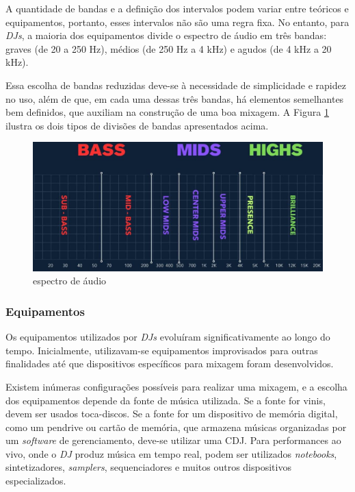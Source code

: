 A quantidade de bandas e a definição dos intervalos podem variar entre teóricos e equipamentos, portanto, esses intervalos não são uma regra fixa. No entanto, para \textit{DJs}, a maioria dos equipamentos divide o espectro de áudio em três bandas: graves (de 20 a 250 Hz), médios (de 250 Hz a 4 kHz) e agudos (de 4 kHz a 20 kHz).

Essa escolha de bandas reduzidas deve-se à necessidade de simplicidade e rapidez no uso, além de que, em cada uma dessas três bandas, há elementos semelhantes bem definidos, que auxiliam na construção de uma boa mixagem. A Figura \ref{fig09} ilustra os dois tipos de divisões de bandas apresentados acima.

\begin{figure}[h]
	\centering
    \includegraphics[scale=0.4]{figuras/fig09.eps}
	\caption{espectro de áudio \cite{headphonestyAudioFrequency}}
	\label{fig09}
\end{figure}


\subsubsection{Equipamentos}

Os equipamentos utilizados por \textit{DJs} evoluíram significativamente ao longo do tempo. Inicialmente, utilizavam-se equipamentos improvisados para outras finalidades até que dispositivos específicos para mixagem foram desenvolvidos.

Existem inúmeras configurações possíveis para realizar uma mixagem, e a escolha dos equipamentos depende da fonte de música utilizada. Se a fonte for vinis, devem ser usados toca-discos. Se a fonte for um dispositivo de memória digital, como um pendrive ou cartão de memória, que armazena músicas organizadas por um \textit{software} de gerenciamento, deve-se utilizar uma CDJ. Para performances ao vivo, onde o \textit{DJ} produz música em tempo real, podem ser utilizados \textit{notebooks}, sintetizadores, \textit{samplers}, sequenciadores e muitos outros dispositivos especializados.


